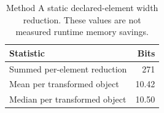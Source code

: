 \begin{table}[t]
\centering
\caption{Method A static declared-element width reduction. These values are not measured runtime memory savings.}
\label{tab:width}
\small
\begin{tabular}{lr}
\toprule
Statistic & Bits \\
\midrule
Summed per-element reduction & 271 \\
Mean per transformed object & 10.42 \\
Median per transformed object & 10.50 \\
\bottomrule
\end{tabular}
\end{table}
